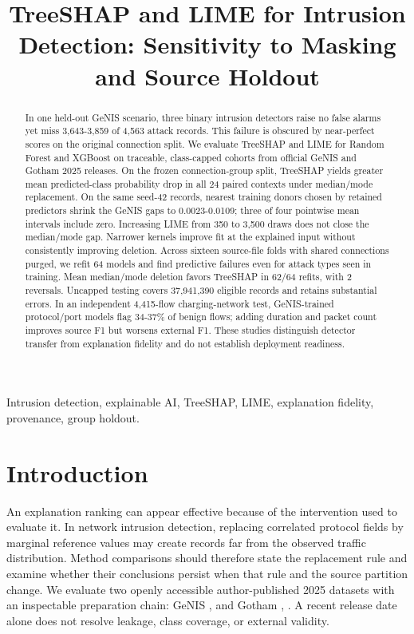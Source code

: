 \documentclass[conference,letterpaper]{IEEEtran}
\begin{document}
\title{TreeSHAP and LIME for Intrusion Detection: Sensitivity to Masking and Source Holdout}
\author{}
\maketitle
\begin{abstract}
In one held-out GeNIS scenario, three binary intrusion detectors raise no false alarms yet miss 3,643-3,859 of 4,563 attack records. This failure is obscured by near-perfect scores on the original connection split. We evaluate TreeSHAP and LIME for Random Forest and XGBoost on traceable, class-capped cohorts from official GeNIS and Gotham 2025 releases. On the frozen connection-group split, TreeSHAP yields greater mean predicted-class probability drop in all 24 paired contexts under median/mode replacement. On the same seed-42 records, nearest training donors chosen by retained predictors shrink the GeNIS gaps to 0.0023-0.0109; three of four pointwise mean intervals include zero. Increasing LIME from 350 to 3,500 draws does not close the median/mode gap. Narrower kernels improve fit at the explained input without consistently improving deletion. Across sixteen source-file folds with shared connections purged, we refit 64 models and find predictive failures even for attack types seen in training. Mean median/mode deletion favors TreeSHAP in 62/64 refits, with 2 reversals. Uncapped testing covers 37,941,390 eligible records and retains substantial errors. In an independent 4,415-flow charging-network test, GeNIS-trained protocol/port models flag 34-37\% of benign flows; adding duration and packet count improves source F1 but worsens external F1. These studies distinguish detector transfer from explanation fidelity and do not establish deployment readiness.
\end{abstract}
\begin{IEEEkeywords}Intrusion detection, explainable AI, TreeSHAP, LIME, explanation fidelity, provenance, group holdout.\end{IEEEkeywords}
\section{Introduction}
An explanation ranking can appear effective because of the intervention used to evaluate it. In network intrusion detection, replacing correlated protocol fields by marginal reference values may create records far from the observed traffic distribution. Method comparisons should therefore state the replacement rule and examine whether their conclusions persist when that rule and the source partition change. We evaluate two openly accessible author-published 2025 datasets with an inspectable preparation chain: GeNIS \cite{ref1}, \cite{ref2} and Gotham \cite{ref3}, \cite{ref4}. A recent release date alone does not resolve leakage, class coverage, or external validity.
\end{document}
